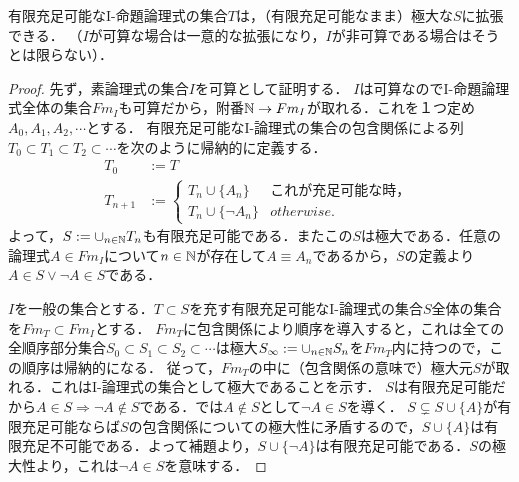 \documentclass[uplatex, dvipdfmx]{jsreport}
\begin{document}
\begin{proposition}[命題論理のコンパクト性定理２]\label{prop-compactness-of-propositional-logic-2}
    有限充足可能なI-命題論理式の集合$T$は，（有限充足可能なまま）極大な$S$に拡張できる．
    （$I$が可算な場合は一意的な拡張になり，$I$が非可算である場合はそうとは限らない）．
\end{proposition}
\begin{proof}
    先ず，素論理式の集合$I$を可算として証明する．
    $I$は可算なのでI-命題論理式全体の集合$Fm_I$も可算だから，附番$\mathbb{N}\to Fm_I$が取れる．これを１つ定め$A_0,A_1,A_2,\cdots$とする．
    有限充足可能なI-論理式の集合の包含関係による列$T_0\subset T_1\subset T_2\subset \cdots$を次のように帰納的に定義する．
    \begin{align*}
        T_0&:=T\\
        T_{n+1}&:=\begin{cases}
            T_n\cup\{A_n\} & これが充足可能な時，\\
            T_n\cup\{\lnot A_n\} &otherwise.
        \end{cases}
    \end{align*}
    よって，$S:=\cup_{n\in\mathbb{N}}T_n$も有限充足可能である．またこの$S$は極大である．任意の論理式$A\in Fm_I$について$n\in\mathbb{N}$が存在して$A\equiv A_n$であるから，$S$の定義より$A\in S\lor \lnot A\in S$である．

    $I$を一般の集合とする．$T\subset S$を充す有限充足可能なI-論理式の集合$S$全体の集合を$Fm_T\subset Fm_I$とする．
    $Fm_T$に包含関係により順序を導入すると，これは全ての全順序部分集合$S_0\subset S_1\subset S_2\subset\cdots$は極大$S_\infty:=\cup_{n\in\mathbb{N}}S_n$を$Fm_T$内に持つので，この順序は帰納的になる．
    従って，$Fm_T$の中に（包含関係の意味で）極大元$S$が取れる．これはI-論理式の集合として極大であることを示す．
    $S$は有限充足可能だから$A\in S\Rightarrow \lnot A\notin S$である．では$A\notin S$として$\lnot A\in S$を導く．
    $S\subsetneq S\cup\{A\}$が有限充足可能ならば$S$の包含関係についての極大性に矛盾するので，$S\cup\{A\}$は有限充足不可能である．よって補題より，$S\cup\{\lnot A\}$は有限充足可能である．$S$の極大性より，これは$\lnot A\in S$を意味する．
\end{proof}
\end{document}
